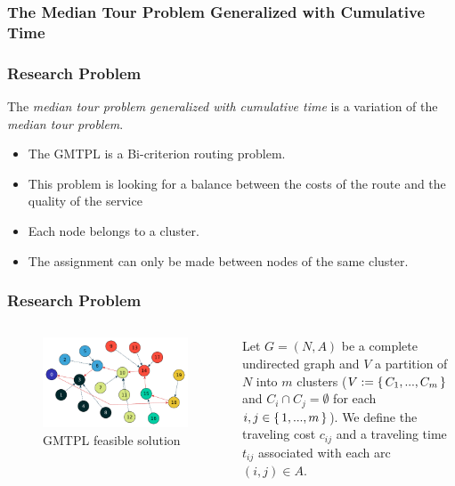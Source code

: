 \documentclass[aspectratio=169]{beamer}
\begin{document}
\subsubsection{The Median Tour Problem Generalized with Cumulative Time}
\begin{frame}
\frametitle{Research Problem}
The \textit{median tour problem generalized with cumulative time} is a variation of the \textit{median tour problem}.
\begin{itemize}
\item The GMTPL is a Bi-criterion routing problem.
\item This problem is looking for a balance between the costs of the route and the quality of the service
\item Each node belongs to a cluster.
\item The assignment can only be made between nodes of the same cluster.
\end{itemize}
\end{frame}

\begin{frame}
\frametitle{Research Problem}
\begin{columns}
	\begin{figure}[ht]
    \centering
    \includegraphics[width=\textwidth]{images/grafo.pdf}
    \caption{GMTPL feasible solution}
    \end{figure}

 
\begin{definition}
Let $G = (N,A)$ be a complete undirected graph and $V$ a partition of $N$ into $m$ clusters ($V := \set{C_{1}, ..., C_{m}}$ and $C_{i} \cap C_{j} = \emptyset$ for each $i,j \in \set{1,...,m}$). We define the traveling cost $c_{ij}$ and a traveling time $t_{ij}$ associated with each arc $(i,j) \in A$.
\end{definition}
\end{columns}
\end{frame}
\end{document}
